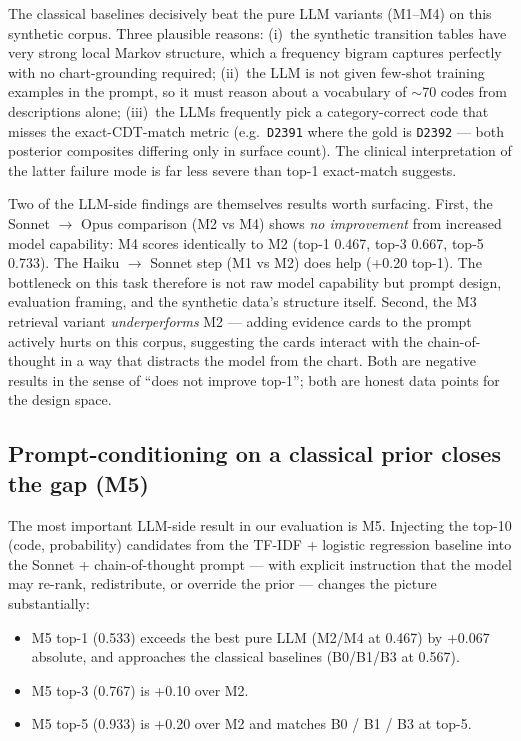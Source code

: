 \documentclass[preprint,authoryear,1p,12pt]{elsarticle}
\begin{document}
The classical baselines decisively beat the pure LLM variants (M1--M4)
on this synthetic corpus. Three plausible reasons: (i)~the synthetic
transition tables have very strong local Markov structure, which a
frequency bigram captures perfectly with no chart-grounding required;
(ii)~the LLM is not given few-shot training examples in the prompt, so
it must reason about a vocabulary of $\sim$70 codes from descriptions
alone; (iii)~the LLMs frequently pick a category-correct code that
misses the exact-CDT-match metric (e.g.\ \texttt{D2391} where the gold
is \texttt{D2392} --- both posterior composites differing only in
surface count). The clinical interpretation of the latter failure mode
is far less severe than top-1 exact-match suggests.

Two of the LLM-side findings are themselves results worth surfacing.
First, the Sonnet $\to$ Opus comparison (M2 vs M4) shows
\emph{no improvement} from increased model capability: M4 scores
identically to M2 (top-1 0.467, top-3 0.667, top-5 0.733). The
Haiku $\to$ Sonnet step (M1 vs M2) does help (+0.20 top-1).
The bottleneck on this task therefore is not raw model capability but
prompt design, evaluation framing, and the synthetic data's structure
itself. Second, the M3 retrieval variant \emph{underperforms} M2 ---
adding evidence cards to the prompt actively hurts on this corpus,
suggesting the cards interact with the chain-of-thought in a way that
distracts the model from the chart. Both are negative results in the
sense of ``does not improve top-1''; both are honest data points for the
design space.

\subsection{Prompt-conditioning on a classical prior closes the gap (M5)}
\label{sec:m5}

The most important LLM-side result in our evaluation is M5. Injecting
the top-10 (code, probability) candidates from the TF-IDF + logistic
regression baseline into the Sonnet + chain-of-thought prompt --- with
explicit instruction that the model may re-rank, redistribute, or
override the prior --- changes the picture substantially:

\begin{itemize}
\item M5 top-1 (0.533) exceeds the best pure LLM (M2/M4 at 0.467) by
+0.067 absolute, and approaches the classical baselines (B0/B1/B3 at
0.567).
\item M5 top-3 (0.767) is +0.10 over M2.
\item M5 top-5 (0.933) is +0.20 over M2 and matches B0 / B1 / B3 at
top-5.
\end{itemize}
\end{document}
